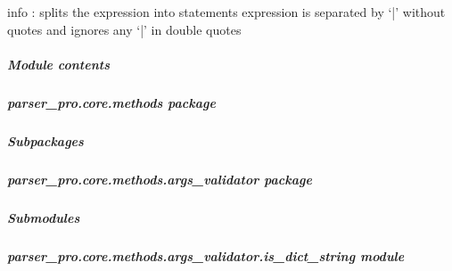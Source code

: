 \documentclass[letterpaper,10pt,english]{sphinxmanual}
\begin{document}
\begin{fulllineitems}
\label{\detokenize{parser_pro.core.lexer:parser_pro.core.lexer.tokens.generate_tokens}}
\pysigstartsignatures
{}
\pysigstopsignatures
\sphinxAtStartPar
info : splits the expression into statements
expression is separated by ‘|’ without quotes and ignores any ‘|’ in double quotes

\end{fulllineitems}



\subparagraph{Module contents}
\label{\detokenize{parser_pro.core.lexer:module-parser_pro.core.lexer}}\label{\detokenize{parser_pro.core.lexer:module-contents}}
\sphinxstepscope


\subparagraph{parser\_pro.core.methods package}
\label{\detokenize{parser_pro.core.methods:parser-pro-core-methods-package}}\label{\detokenize{parser_pro.core.methods::doc}}

\subparagraph{Subpackages}
\label{\detokenize{parser_pro.core.methods:subpackages}}
\sphinxstepscope


\subparagraph{parser\_pro.core.methods.args\_validator package}
\label{\detokenize{parser_pro.core.methods.args_validator:parser-pro-core-methods-args-validator-package}}\label{\detokenize{parser_pro.core.methods.args_validator::doc}}

\subparagraph{Submodules}
\label{\detokenize{parser_pro.core.methods.args_validator:submodules}}

\subparagraph{parser\_pro.core.methods.args\_validator.is\_dict\_string module}
\label{\detokenize{parser_pro.core.methods.args_validator:module-parser_pro.core.methods.args_validator.is_dict_string}}\label{\detokenize{parser_pro.core.methods.args_validator:parser-pro-core-methods-args-validator-is-dict-string-module}}
\end{document}
